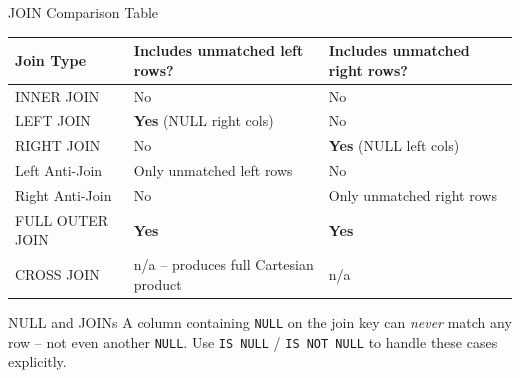 \begin{frame}{JOIN Comparison Table}
  \renewcommand{\arraystretch}{1.25}
  \begin{tabularx}{\linewidth}{@{}lXX@{}}
    \toprule
    \textbf{Join Type}  & \textbf{Includes unmatched left rows?} & \textbf{Includes unmatched right rows?} \\
    \midrule
    INNER JOIN       & No  & No \\
    LEFT JOIN        & \textbf{Yes} (NULL right cols) & No \\
    RIGHT JOIN       & No  & \textbf{Yes} (NULL left cols) \\
    Left Anti-Join   & Only unmatched left rows & No \\
    Right Anti-Join  & No  & Only unmatched right rows \\
    FULL OUTER JOIN  & \textbf{Yes} & \textbf{Yes} \\
    CROSS JOIN       & n/a -- produces full Cartesian product & n/a \\
    \bottomrule
  \end{tabularx}

  \begin{alertblock}{NULL and JOINs}
    A column containing \texttt{NULL} on the join key can \emph{never} match any row -- not even
    another \texttt{NULL}. Use \texttt{IS NULL} / \texttt{IS NOT NULL} to handle these cases explicitly.
  \end{alertblock}
\end{frame}
